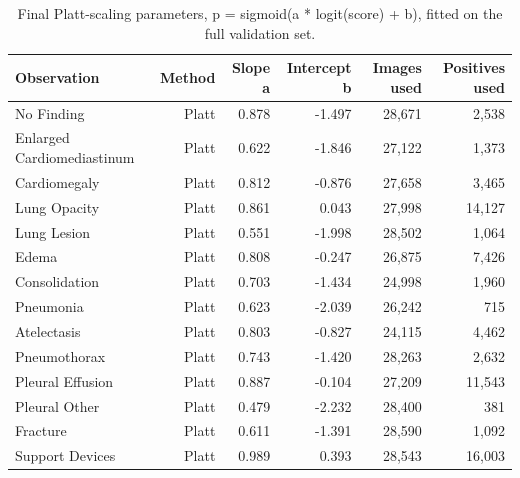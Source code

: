 \begin{table}[t]
\centering
\small
\begin{tabular}{lrrrrr}
\hline
Observation & Method & Slope a & Intercept b & Images used & Positives used \\
\hline
No Finding & Platt & 0.878 & -1.497 & 28,671 & 2,538 \\
Enlarged Cardiomediastinum & Platt & 0.622 & -1.846 & 27,122 & 1,373 \\
Cardiomegaly & Platt & 0.812 & -0.876 & 27,658 & 3,465 \\
Lung Opacity & Platt & 0.861 & 0.043 & 27,998 & 14,127 \\
Lung Lesion & Platt & 0.551 & -1.998 & 28,502 & 1,064 \\
Edema & Platt & 0.808 & -0.247 & 26,875 & 7,426 \\
Consolidation & Platt & 0.703 & -1.434 & 24,998 & 1,960 \\
Pneumonia & Platt & 0.623 & -2.039 & 26,242 & 715 \\
Atelectasis & Platt & 0.803 & -0.827 & 24,115 & 4,462 \\
Pneumothorax & Platt & 0.743 & -1.420 & 28,263 & 2,632 \\
Pleural Effusion & Platt & 0.887 & -0.104 & 27,209 & 11,543 \\
Pleural Other & Platt & 0.479 & -2.232 & 28,400 & 381 \\
Fracture & Platt & 0.611 & -1.391 & 28,590 & 1,092 \\
Support Devices & Platt & 0.989 & 0.393 & 28,543 & 16,003 \\
\hline
\end{tabular}
\caption{Final Platt-scaling parameters, p = sigmoid(a * logit(score) + b), fitted on the full validation set.}
\label{tab:table3_final_calibration_parameters}
\end{table}
